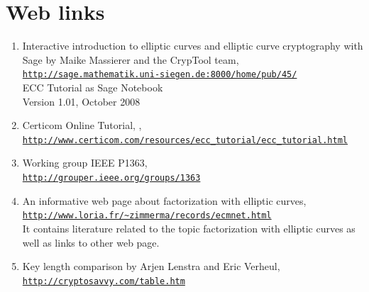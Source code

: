 \chapter*{Web links}

\begin{enumerate}
        \hypertarget{ec:Web-Link:Sage_Massierer}{} 
   \item Interactive introduction to elliptic curves and elliptic curve cryptography
        with Sage by Maike Massierer and the CrypTool team,\\
        \href{http://sage.mathematik.uni-siegen.de:8000/home/pub/45/}
        {\texttt{http://sage.mathematik.uni-siegen.de:8000/home/pub/45/}} \\
        ECC Tutorial as Sage Notebook \\
        Version 1.01, October 2008
   \item Certicom Online Tutorial, ,\\
        \href{http://www.certicom.com/resources/ecc_tutorial/ecc_tutorial.html}
        {\texttt{http://www.certicom.com/resources/ecc\_tutorial/ecc\_tutorial.html}}
		
   \item Working group IEEE P1363, \\
        \href{http://grouper.ieee.org/groups/1363}
        {\texttt{http://grouper.ieee.org/groups/1363}}

   \item \hypertarget{Lenstra2}{}
        An informative web page about factorization with elliptic curves, \\
        \href{http://www.loria.fr/~zimmerma/records/ecmnet.html}
	{\texttt{http://www.loria.fr/\~{}zimmerma/records/ecmnet.html}} \\
        It contains literature related to the topic factorization with 
	elliptic curves as well as links to other web page. 

   \item Key length comparison by Arjen Lenstra and Eric Verheul,\\
        \href{http://cryptosavvy.com/table.htm}
        {\texttt{http://cryptosavvy.com/table.htm}}

\end{enumerate}



